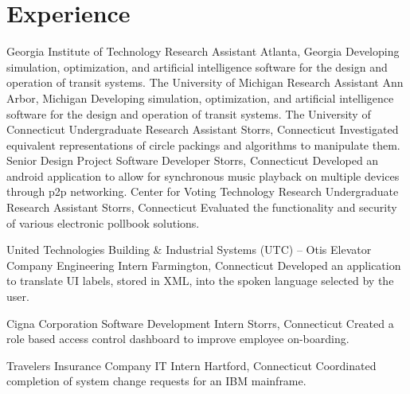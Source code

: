 \section{Experience}
		{Georgia Institute of Technology}
		{Research Assistant}
		{Atlanta, Georgia}{}
		{Developing simulation, optimization, and artificial intelligence software for the design and operation of transit systems.}
		{The University of Michigan}
		{Research Assistant}
		{Ann Arbor, Michigan}{}
		{Developing simulation, optimization, and artificial intelligence software for the design and operation of transit systems.}
		{The University of Connecticut}
		{Undergraduate Research Assistant}
		{Storrs, Connecticut}{}
		{Investigated equivalent representations of circle packings and algorithms to manipulate them.}
		{Senior Design Project}
		{Software Developer}
		{Storrs, Connecticut}{}
		{Developed an android application to allow for synchronous music playback on multiple devices through p2p networking.}
		{Center for Voting Technology Research}
		{Undergraduate Research Assistant}
		{Storrs, Connecticut}{}
		{Evaluated the functionality and security of various electronic pollbook solutions.}

		{United Technologies Building \& Industrial Systems (UTC) -- Otis Elevator Company}
		{Engineering Intern}
		{Farmington, Connecticut}{}
		{Developed an application to translate UI labels, stored in XML, into the spoken language selected by the user.}

		{Cigna Corporation}
		{Software Development Intern}
		{Storrs, Connecticut}{}
		{Created a role based access control dashboard to improve employee on-boarding.}

		{Travelers Insurance Company}
		{IT Intern}
		{Hartford, Connecticut}{}
		{Coordinated completion of system change requests for an IBM mainframe.}
